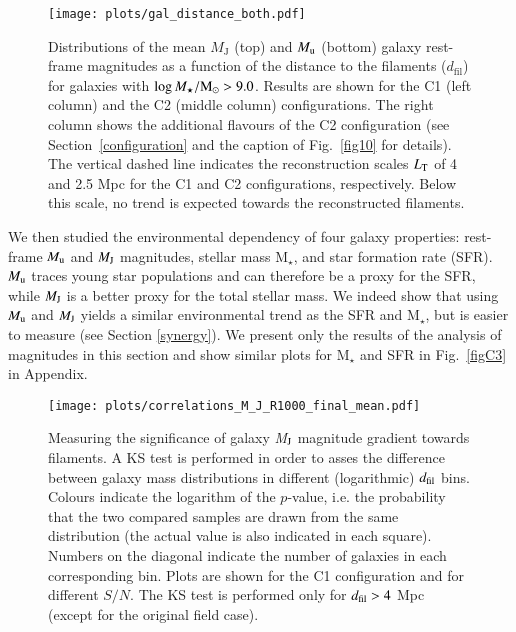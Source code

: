\documentclass{aa}
\begin{document}
\begin{figure*}[!t]
\begin{center}
\texttt{[image: plots/gal\_distance\_both.pdf]}
\caption{Distributions of the mean $M_{\mathrm{J}}$ (top) and $M_{\rm u}$  (bottom) galaxy rest-frame magnitudes as a function of the distance to the filaments ($d_{\mathrm{fil}}$) for galaxies with $\log M_{\star}/{\rm M}_{\odot} > 9.0$. Results are shown for the C1 (left column) and the C2 (middle column) configurations. The right column shows the additional flavours of the C2 configuration (see Section~\ref{configuration} and the caption of Fig.~\ref{fig10} for details). The vertical dashed line indicates the reconstruction scales $L_{\rm T}$ of 4 and 2.5 Mpc for the C1 and C2 configurations, respectively. Below this scale, no trend is expected towards the reconstructed filaments. }
\label{fig12}
\end{center}
\end{figure*}

We then studied the environmental dependency of four galaxy properties: rest-frame ${\it M}_{\rm u}$ and ${\it M}_{\rm J}$ magnitudes, stellar mass M$_{\star}$, and star formation rate (SFR). ${\it M}_{\rm u}$ traces young star populations and can therefore be a proxy for the SFR, while ${\it M}_{\rm J}$ is a better proxy for the total stellar mass. We indeed show that using ${\it M}_{\rm u}$ and ${\it M}_{\rm J}$  yields a similar environmental trend as the SFR and M$_{\star}$, but is easier to measure (see Section \ref{synergy}). We  present only the results of the analysis of magnitudes in this section and show similar plots for M$_{\star}$ and SFR in Fig.~\ref{figC3} in Appendix.

\begin{figure*}
\begin{center}
\texttt{[image: plots/correlations\_M\_J\_R1000\_final\_mean.pdf]}
\caption{Measuring the significance of galaxy {\it M}$_{\rm J}$ magnitude gradient towards filaments. A KS test is performed in order to asses the difference between galaxy mass distributions in different (logarithmic) $d_{\rm fil}$ bins. Colours indicate the logarithm of the $p$-value, i.e. the probability that the two compared samples are drawn from the same distribution (the actual value is also indicated in each square). Numbers on the diagonal indicate the number of galaxies in each corresponding bin. Plots are shown for the C1 configuration and for different $S/N$. The KS test is performed only for  $d_{\rm fil} > 4$ Mpc  (except for the original field case).}
\label{fig12a}
\end{center}
\end{figure*}
\end{document}
